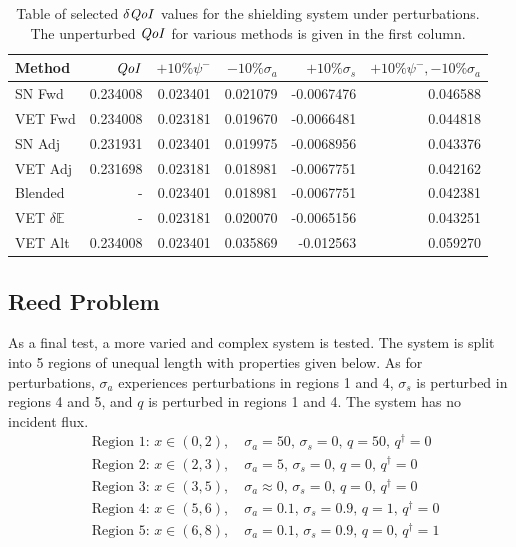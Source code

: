 \documentclass[12pt]{report}
\newcommand{\Edd}{\mathbb{E}}
\newcommand{\sigs}{\sigma_s}
\newcommand{\siga}{\sigma_a}
\newcommand{\qoi}{{\it QoI}\xspace}
\begin{document}
\begin{table}[H]
\centering
  \begin{tabular}{| l | r || r | r | r | r |}
    \hline
    Method  & $\qoi$ & $+10\% \psi^- $  & $-10\% \siga $ & $+10\% \sigs $ & $+10\% \psi^-,-10\% \siga$ \\ \hline
     SN Fwd 			&0.234008 	&0.023401 &0.021079 &-0.0067476 & 0.046588\\ \hline
     VET Fwd			&0.234008 	&0.023181 &0.019670 &-0.0066481 &0.044818\\ \hline
     SN Adj  			&0.231931 	&0.023401 &0.019975 &-0.0068956 &0.043376\\ \hline
     VET Adj 			&0.231698 	&0.023181 &0.018981 &-0.0067751 &0.042162\\ \hline
     Blended 			&-			&0.023401 &0.018981 &-0.0067751 &0.042381\\ \hline
     VET $\delta \Edd$ 	&-			&0.023181 &0.020070 &-0.0065156 &0.043251\\ \hline
     VET Alt			&0.234008 	&0.023401 &0.035869 &-0.012563	&0.059270\\ \hline
    \end{tabular}
  \caption{Table of selected $\delta \qoi$ values for the shielding system under perturbations. The unperturbed $\qoi$ for various methods is given in the first column.}
\end{table}

\subsection{Reed Problem}
As a final test, a more varied and complex system is tested. The system is split into 5 regions of unequal length with properties given below. As for perturbations, $\siga$ experiences perturbations in regions 1 and 4, $\sigs$ is perturbed in regions 4 and 5, and $q$ is perturbed in regions 1 and 4. The system has no incident flux.
\begin{equation*}
\begin{split}
&\text{Region 1: } x \in (0,2), \quad \siga=50, \, 			\sigs=0, \, q=50, \, q^\dag=0 \\
&\text{Region 2: } x \in (2,3), \quad \siga=5, \, 			\sigs=0, \, q=0, \, q^\dag=0 \\
&\text{Region 3: } x \in (3,5), \quad \siga \approx 0, \,	\sigs=0, \, q=0, \, q^\dag=0 \\
&\text{Region 4: } x \in (5,6), \quad \siga=0.1, \, 		\sigs=0.9, \, q=1, \, q^\dag=0 \\
&\text{Region 5: } x \in (6,8), \quad \siga=0.1, \, 		\sigs=0.9, \, q=0, \, q^\dag=1 \\
\end{split}
\end{equation*}
\end{document}
